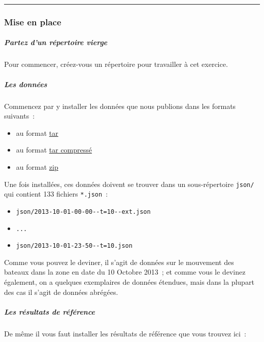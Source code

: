     \begin{center}\rule{0.5\linewidth}{\linethickness}\end{center}

    \hypertarget{mise-en-place}{%
\subsubsection{Mise en place}\label{mise-en-place}}

    \hypertarget{partez-dun-ruxe9pertoire-vierge}{%
\subparagraph{Partez d'un répertoire
vierge}\label{partez-dun-ruxe9pertoire-vierge}}

    Pour commencer, créez-vous un répertoire pour travailler à cet exercice.

    \hypertarget{les-donnuxe9es}{%
\subparagraph{Les données}\label{les-donnuxe9es}}

    Commencez par y installer les données que nous publions dans les formats
suivants~:

\begin{itemize}
\tightlist
\item
  au format \href{data/ships-json.tar}{tar}
\item
  au format \href{data/ships-json.tgz}{tar compressé}
\item
  au format \href{data/ships-json.zip}{zip}
\end{itemize}

Une fois installées, ces données doivent se trouver dans un
sous-répertoire \texttt{json/} qui contient 133 fichiers
\texttt{*.json}~:

\begin{itemize}
\tightlist
\item
  \texttt{json/2013-10-01-00-00-\/-t=10-\/-ext.json}
\item
  \texttt{...}
\item
  \texttt{json/2013-10-01-23-50-\/-t=10.json}
\end{itemize}

    Comme vous pouvez le deviner, il s'agit de données sur le mouvement des
bateaux dans la zone en date du 10 Octobre 2013~; et comme vous le
devinez également, on a quelques exemplaires de données étendues, mais
dans la plupart des cas il s'agit de données abrégées.

    \hypertarget{les-ruxe9sultats-de-ruxe9fuxe9rence}{%
\subparagraph{Les résultats de
référence}\label{les-ruxe9sultats-de-ruxe9fuxe9rence}}

    De même il vous faut installer les résultats de référence que vous
trouvez ici~:

